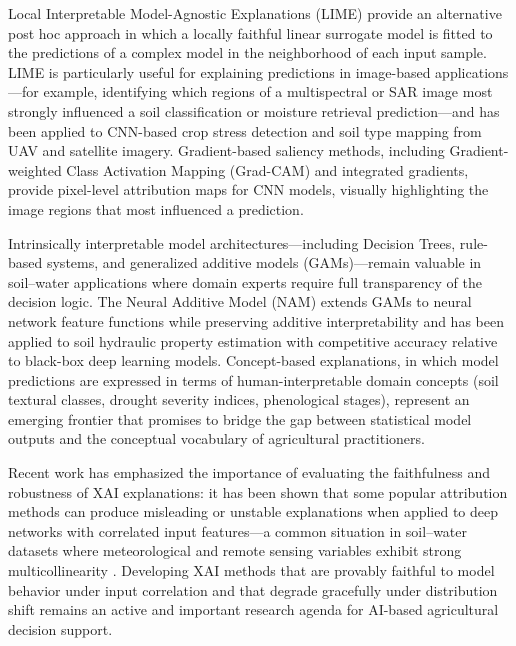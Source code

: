 \documentclass[land,review,accept,pdftex,oneauthor]{Definitions/mdpi}
\begin{document}
Local Interpretable Model-Agnostic Explanations (LIME) \citep{ribeiro2016lime} provide an alternative post hoc approach in which a locally faithful linear surrogate model is fitted to the predictions of a complex model in the neighborhood of each input sample. LIME is particularly useful for explaining predictions in image-based applications---for example, identifying which regions of a multispectral or SAR image most strongly influenced a soil classification or moisture retrieval prediction---and has been applied to CNN-based crop stress detection and soil type mapping from UAV and satellite imagery. Gradient-based saliency methods, including Gradient-weighted Class Activation Mapping (Grad-CAM) \citep{selvaraju2017gradcam} and integrated gradients, provide pixel-level attribution maps for CNN models, visually highlighting the image regions that most influenced a prediction.

Intrinsically interpretable model architectures---including Decision Trees, rule-based systems, and generalized additive models (GAMs)---remain valuable in soil--water applications where domain experts require full transparency of the decision logic. The Neural Additive Model (NAM) \citep{agarwal2021neural} extends GAMs to neural network feature functions while preserving additive interpretability and has been applied to soil hydraulic property estimation with competitive accuracy relative to black-box deep learning models. Concept-based explanations, in which model predictions are expressed in terms of human-interpretable domain concepts (soil textural classes, drought severity indices, phenological stages), represent an emerging frontier that promises to bridge the gap between statistical model outputs and the conceptual vocabulary of agricultural practitioners.

Recent work has emphasized the importance of evaluating the faithfulness and robustness of XAI explanations: it has been shown that some popular attribution methods can produce misleading or unstable explanations when applied to deep networks with correlated input features---a common situation in soil--water datasets where meteorological and remote sensing variables exhibit strong multicollinearity \citep{adebayo2018sanity}. Developing XAI methods that are provably faithful to model behavior under input correlation and that degrade gracefully under distribution shift remains an active and important research agenda for AI-based agricultural decision support.

\end{document}
